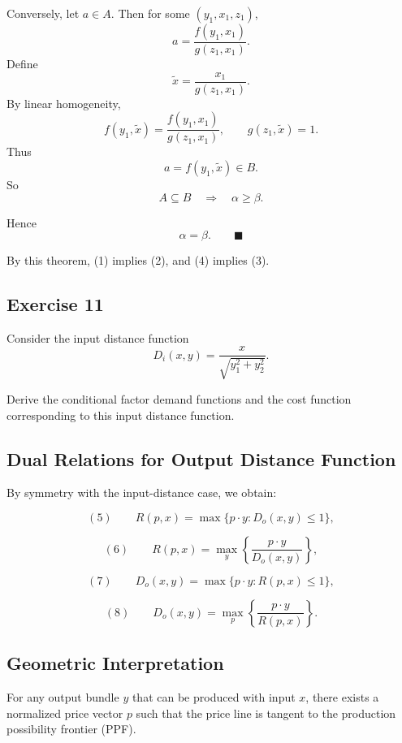 \medskip

Conversely, let $a\in A$. Then for some $(y_1,x_1,z_1)$,
\[
a = \frac{f(y_1,x_1)}{g(z_1,x_1)}.
\]
Define
\[
\tilde x = \frac{x_1}{g(z_1,x_1)}.
\]
By linear homogeneity,
\[
f(y_1,\tilde x)
=
\frac{f(y_1,x_1)}{g(z_1,x_1)},
\qquad
g(z_1,\tilde x)=1.
\]
Thus
\[
a=f(y_1,\tilde x)\in B.
\]
So
\[
A \subseteq B
\quad \Rightarrow \quad
\alpha \ge \beta.
\]

Hence
\[
\alpha=\beta.
\qquad \blacksquare
\]

\medskip

By this theorem, (1) implies (2), and (4) implies (3).


\begin{tcolorbox}

\subsection*{Exercise 11}

Consider the input distance function
\[
D_i(x,y)=\frac{x}{\sqrt{y_1^2+y_2^2}}.
\]

Derive the conditional factor demand functions and the cost function
corresponding to this input distance function.


\end{tcolorbox}

\subsection*{Dual Relations for Output Distance Function}

By symmetry with the input-distance case, we obtain:

\[
(5)\qquad
R(p,x)
=
\max \{ p\cdot y : D_o(x,y)\le 1 \},
\]

\[
(6)\qquad
R(p,x)
=
\max_y \left\{ \frac{p\cdot y}{D_o(x,y)} \right\},
\]

\[
(7)\qquad
D_o(x,y)
=
\max \{ p\cdot y : R(p,x)\le 1 \},
\]

\[
(8)\qquad
D_o(x,y)
=
\max_p \left\{ \frac{p\cdot y}{R(p,x)} \right\}.
\]

\subsection*{Geometric Interpretation}

For any output bundle $y$ that can be produced with input $x$,
there exists a normalized price vector $p$ such that the price line
is tangent to the production possibility frontier (PPF).

